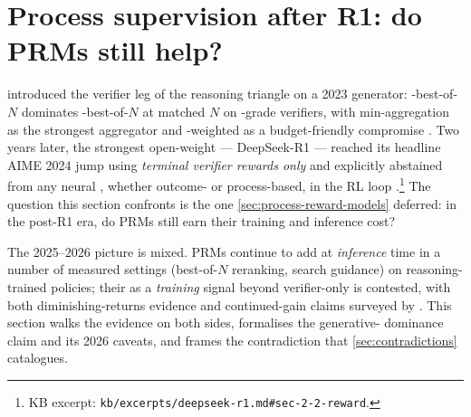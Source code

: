 
\section{Process supervision after R1: do PRMs still help?}
\label{sec:prm-survival}
\label{sec:prm-after-r1}

 introduced the verifier leg of the
reasoning triangle on a 2023 generator: -best-of-$N$ dominates
-best-of-$N$ at matched $N$ on -grade verifiers, with
min-aggregation as the strongest aggregator and -weighted
 as a budget-friendly compromise
\citep[\S 4]{lightman2023-prm800k}. Two years later, the strongest
open-weight  --- DeepSeek-R1 --- reached its headline
AIME 2024 jump using \emph{terminal verifier rewards only} and
explicitly abstained from any neural , whether outcome- or
process-based, in the RL loop \citep[\S 2.2]{deepseek-r1}.\footnote{KB
excerpt: \nolinkurl{kb/excerpts/deepseek-r1.md#sec-2-2-reward}.} The
question this section confronts is the one \cref{sec:process-reward-models}
deferred: in the post-R1 era, do PRMs still earn their training
and inference cost?

The 2025--2026 picture is mixed. PRMs continue to add  at
\emph{inference} time in a number of measured settings (best-of-$N$
reranking, search guidance) on reasoning-trained policies; their 
as a \emph{training} signal beyond verifier-only  is contested,
with both diminishing-returns evidence and continued-gain claims
surveyed by \citet{zheng2025-prm-survey}.
This section walks the evidence on both sides, formalises the
generative- dominance claim and its 2026 caveats, and frames the
contradiction that \cref{sec:contradictions} catalogues.

